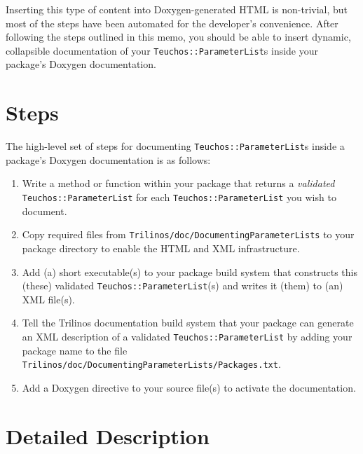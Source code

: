 \documentclass[pdf,ps2pdf,12pt]{smemo}
\begin{document}
\begin{memo}

Inserting this type of content into Doxygen-generated HTML is
non-trivial, but most of the steps have been automated for the
developer's convenience.  After following the steps outlined in this
memo, you should be able to insert dynamic, collapsible documentation
of your \texttt{Teuchos::ParameterList}s inside your package's Doxygen
documentation.

\section{Steps}

The high-level set of steps for documenting \texttt{Teuchos::ParameterList}s inside a package's Doxygen documentation is as follows:

\begin{enumerate}

\item Write a method or function within your package that returns a
  \emph{validated} \texttt{Teuchos::Pa\-ra\-me\-ter\-List} for each
  \texttt{Teuchos::ParameterList} you wish to document.

\item Copy required files from
  \texttt{Trilinos/doc/DocumentingParameterLists} to your package
  directory to enable the HTML and XML infrastructure.

\item Add (a) short executable(s) to your package build system that
  constructs this (these) validated \texttt{Teuchos::ParameterList}(s)
  and writes it (them) to (an) XML file(s).

\item Tell the Trilinos documentation build system that your package
  can generate an XML description of a validated
  \texttt{Teuchos::ParameterList} by adding your package name to the
  file \texttt{Trilinos/doc/DocumentingParameterLists/Packages.txt}.

\item Add a Doxygen directive to your source file(s) to activate the
  documentation.

\end{enumerate}

\section{Detailed Description}


\end{memo}
\end{document}
